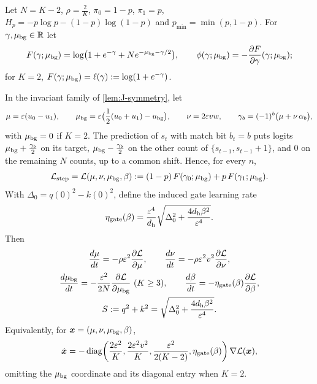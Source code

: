 Let $N=K-2$, $\rho=\frac{2}{K}$, $\pi_0=1-p$, $\pi_1=p$, $H_p=-p\log p-(1-p)\log(1-p)$ and $p_{\min}=\min(p,1-p)$. For $\gamma,\mu_{\mathrm{bg}}\in\mathbb R$ let
\[
 F(\gamma;\cbg)=\log\bigl(1+e^{-\gamma}+N e^{-\cbg-\gamma/2}\bigr),\qquad \phi(\gamma;\cbg)=-\pd{F}{\gamma}(\gamma;\cbg);
\]
for $K=2$, $F(\gamma;\mu_{\mathrm{bg}})=\ell(\gamma):=\log(1+e^{-\gamma})$.

\begin{lemma}
\label{lem:J-reduce}
In the invariant family of \cref{lem:J-symmetry}, let
\[
 \cnt=\initscale(u_0-u_1),\qquad \cbg=\initscale\bigl(\tfrac{1}{2}(u_0+u_1)-u_{\mathrm{bg}}\bigr),\qquad \nu=2\initscale vw,\qquad \gamma_b=(-1)^b\bigl(\cnt+\nu\,\alpha_b\bigr),
\]
with $\mu_{\mathrm{bg}}=0$ if $K=2$. The prediction of $s_t$ with match bit $b_t=b$ puts logits $\mu_{\mathrm{bg}}+\frac{\gamma_b}{2}$ on its target, $\mu_{\mathrm{bg}}-\frac{\gamma_b}{2}$ on the other count of
$\{s_{t-1},s_{t-1}+1\}$, and $0$ on the remaining $N$ counts, up to a common shift. Hence, for every $n$,
\[
 \mathcal L_{\mathrm{step}}=\mathcal L(\mu,\nu,\mu_{\mathrm{bg}},\beta):=(1-p)\,F(\gamma_0;\mu_{\mathrm{bg}})+p\,F(\gamma_1;\mu_{\mathrm{bg}}).
\]
With $\Delta_0=q(0)^2-k(0)^2$, define the induced gate learning rate
\[
 \eta_{\mathrm{gate}}(\beta)=\frac{\varepsilon^4}{d_{\mathrm h}}\sqrt{\Delta_0^2+\frac{4d_{\mathrm h}\beta^2}{\varepsilon^4}}.
\]
Then
\begin{equation}
 \begin{gathered}
 \ddt{\cnt}=-\rho\initscale^2\pd{\mathcal L}{\cnt},\qquad \ddt{\nu}=-\rho\initscale^2v^2\pd{\mathcal L}{\nu},\\ \ddt{\cbg}=-\frac{\initscale^2}{2N}\pd{\mathcal L}{\cbg}\ (K\ge3),\qquad \ddt{\beta}=-\eta_{\mathrm{gate}}(\beta)\pd{\mathcal L}{\beta},\\
 S:=q^2+k^2=\sqrt{\Delta_0^2+\frac{4d_{\mathrm h}\beta^2}{\initscale^4}}.
 \end{gathered}
 \label{eq:J-flow}
\end{equation}
Equivalently, for $\bm x=(\mu,\nu,\mu_{\mathrm{bg}},\beta)$,
\[
 \dot{\bm x}=-\operatorname{diag}\!\left(
 \frac{2\varepsilon^2}{K},\frac{2\varepsilon^2v^2}{K},
 \frac{\varepsilon^2}{2(K-2)},\eta_{\mathrm{gate}}(\beta)\right)\nabla\mathcal L(\bm x),
\]
omitting the $\mu_{\mathrm{bg}}$ coordinate and its diagonal entry when $K=2$.
\end{lemma}

